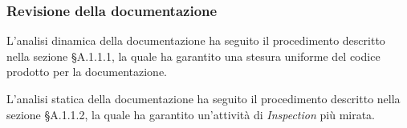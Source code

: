 \subsubsection{Revisione della documentazione}

L'analisi dinamica della documentazione ha seguito il procedimento descritto nella sezione §A.1.1.1, la quale ha garantito una stesura uniforme del codice prodotto per la documentazione.

L'analisi statica della documentazione ha seguito il procedimento descritto nella sezione §A.1.1.2, la quale ha garantito un'attività di \textit{Inspection} più mirata.